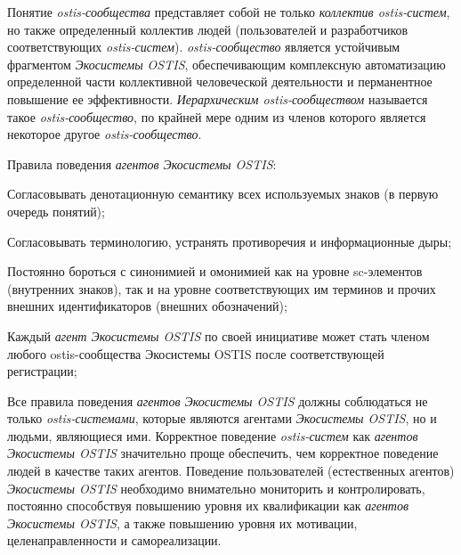 Понятие \textit{ostis-сообщества} представляет собой не только \textit{коллектив ostis-систем}, но также определенный коллектив людей (пользователей и разработчиков соответствующих \textit{ostis-систем}). 
\textit{ostis-сообщество} является устойчивым фрагментом \textit{Экосистемы OSTIS}, обеспечивающим комплексную автоматизацию определенной части коллективной человеческой деятельности и перманентное повышение ее эффективности. 
\textit{Иерархическим ostis-сообществом} называется такое \textit{ostis-сообщество}, по крайней мере одним из членов которого является некоторое другое \textit{ostis-сообщество}.

Правила поведения \textit{агентов Экосистемы OSTIS}:
\begin{textitemize}
    \item Согласовывать денотационную семантику всех используемых знаков (в первую очередь понятий);
    \item Согласовывать терминологию, устранять противоречия и информационные дыры;
    \item Постоянно бороться с синонимией и омонимией как на уровне sc-элементов (внутренних знаков), так и на уровне соответствующих им терминов и прочих внешних идентификаторов (внешних обозначений);
    \item Каждый \textit{агент Экосистемы OSTIS} по своей инициативе может стать членом любого ostis-сообщества Экосистемы OSTIS после соответствующей регистрации;
\end{textitemize}

Все правила поведения \textit{агентов Экосистемы OSTIS} должны соблюдаться не только \textit{ostis-системами}, которые являются агентами \textit{Экосистемы OSTIS}, но и людьми, являющиеся ими. 
Корректное поведение \textit{ostis-систем} как \textit{агентов Экосистемы OSTIS} значительно проще обеспечить, чем корректное поведение людей в качестве таких агентов. 
Поведение пользователей (естественных агентов) \textit{Экосистемы OSTIS} необходимо внимательно мониторить и контролировать, постоянно способствуя повышению уровня их квалификации как \textit{агентов Экосистемы OSTIS}, а также повышению уровня их мотивации, целенаправленности и самореализации.


